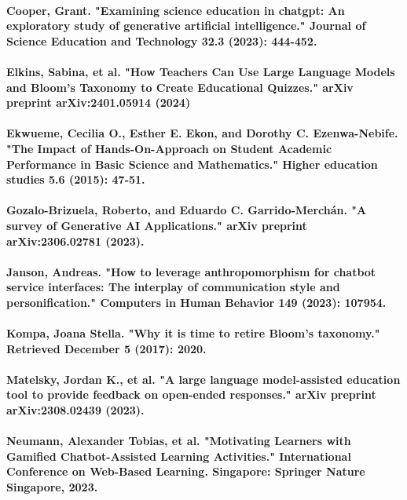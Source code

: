 \documentclass{article}
\begin{document}
\paragraph{Cooper, Grant. "Examining science education in chatgpt: An exploratory study of generative artificial intelligence." Journal of Science Education and Technology 32.3 (2023): 444-452. }
\paragraph{Elkins, Sabina, et al. "How Teachers Can Use Large Language Models and Bloom's Taxonomy to Create Educational Quizzes." arXiv preprint arXiv:2401.05914 (2024)}
\paragraph{Ekwueme, Cecilia O., Esther E. Ekon, and Dorothy C. Ezenwa-Nebife. "The Impact of Hands-On-Approach on Student Academic Performance in Basic Science and Mathematics." Higher education studies 5.6 (2015): 47-51.}
\paragraph{Gozalo-Brizuela, Roberto, and Eduardo C. Garrido-Merchán. "A survey of Generative AI Applications." arXiv preprint arXiv:2306.02781 (2023).}
\paragraph{Janson, Andreas. "How to leverage anthropomorphism for chatbot service interfaces: The interplay of communication style and personification." Computers in Human Behavior 149 (2023): 107954.}
\paragraph{Kompa, Joana Stella. "Why it is time to retire Bloom’s taxonomy." Retrieved December 5 (2017): 2020.}
\paragraph{Matelsky, Jordan K., et al. "A large language model-assisted education tool to provide feedback on open-ended responses." arXiv preprint arXiv:2308.02439 (2023).}
\paragraph{Neumann, Alexander Tobias, et al. "Motivating Learners with Gamified Chatbot-Assisted Learning Activities." International Conference on Web-Based Learning. Singapore: Springer Nature Singapore, 2023.}
\end{document}
